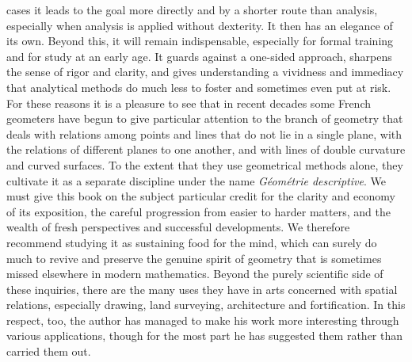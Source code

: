 %
cases it leads to the goal more directly and by a shorter route than analysis, especially when analysis is applied without dexterity. It then has an elegance of its own. Beyond this, it will remain indispensable, especially for formal training and for study at an early age. It guards against a one-sided approach, sharpens the sense of rigor and clarity, and gives understanding a vividness and immediacy that analytical methods do much less to foster and sometimes even put at risk. For these reasons it is a pleasure to see that in recent decades some French geometers have begun to give particular attention to the branch of geometry that deals with relations among points and lines that do not lie in a single plane, with the relations of different planes to one another, and with lines of double curvature and curved surfaces. To the extent that they use geometrical methods alone, they cultivate it as a separate discipline under the name \textit{Géométrie descriptive}. We must give this book on the subject particular credit for the clarity and economy of its exposition, the careful progression from easier to harder matters, and the wealth of fresh perspectives and successful developments. We therefore recommend studying it as sustaining food for the mind, which can surely do much to revive and preserve the genuine spirit of geometry that is sometimes missed elsewhere in modern mathematics. Beyond the purely scientific side of these inquiries, there are the many uses they have in arts concerned with spatial relations, especially drawing, land surveying, architecture and fortification. In this respect, too, the author has managed to make his work more interesting through various applications, though for the most part he has suggested them rather than carried them out.
